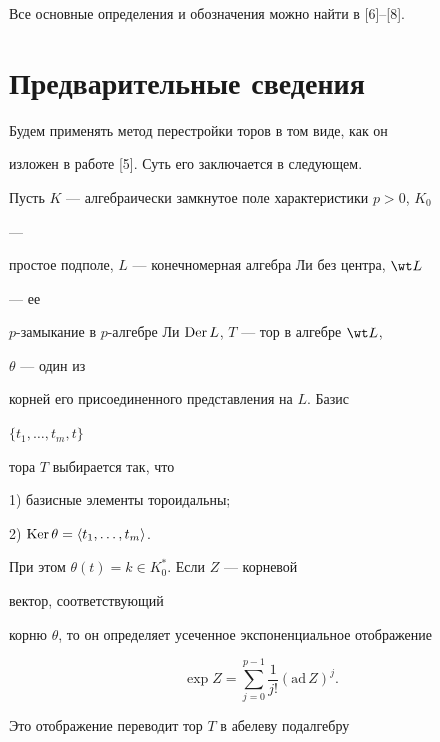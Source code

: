  


Все основные определения и обозначения можно найти в [6]--[8]. 


 


\section{Предварительные сведения}


 


Будем применять метод перестройки торов в том виде, как он 


изложен в работе [5]. Суть его заключается в следующем. 


 


Пусть $K$ --- алгебраически замкнутое поле характеристики $p>0$, $K_0$ 


--- 


простое подполе, $L$ --- конечномерная алгебра Ли без центра, $\wt L$ 


--- ее 


$p$-замыкание в $p$-алгебре Ли $\operatorname{Der} L$, $T$ --- тор в алгебре $\wt L$, 


$\theta$ --- один из 


корней его присоединенного представления на $L$. Базис 


$\{t_1,\dotsc,t_m,t\}$ 


тора $T$ выбирается так, что 


 


1) базисные элементы тороидальны; 


 


2) $\operatorname{Ker}\theta=\langle t_1,\dotsc,t_m\rangle$. 


 


\noindent При этом $\theta(t)=k\in K^*_0$. Если $Z$ --- корневой 


вектор, соответствующий 


корню $\theta$, то он определяет усеченное экспоненциальное отображение 


$$ 


\exp Z=\sum^{p-1}_{j=0}\frac{1}{j!}(\text{ad}\,Z)^j. 


$$ 


Это отображение переводит тор $T$ в абелеву подалгебру 


$$ 


